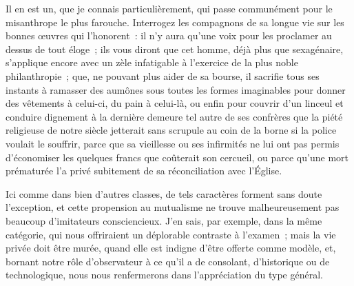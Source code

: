 \documentclass[french,twoside]{book} %
\begin{document}
Il en est un, que je connais particulièrement, qui passe communément pour le misanthrope le plus farouche. Interrogez les compagnons de sa longue vie sur les bonnes œuvres qui l’honorent : il n’y aura qu’une voix pour les proclamer au dessus de tout éloge ; ils vous diront que cet homme, déjà plus que sexagénaire, s’applique encore avec un zèle infatigable à l’exercice de la plus noble philanthropie ; que, ne pouvant plus aider de sa bourse, il sacrifie tous ses instants à ramasser des aumônes sous toutes les formes imaginables pour donner des vêtements à celui-ci, du pain à celui-là, ou enfin pour couvrir d’un linceul et conduire dignement à la dernière demeure tel autre de ses confrères que la piété religieuse de  notre siècle jetterait sans scrupule au coin de la borne si la police voulait le souffrir, parce que sa vieillesse ou ses infirmités ne lui ont pas permis d’économiser les quelques francs que coûterait son cercueil, ou parce qu’une mort prématurée l’a privé subitement de sa réconciliation avec l’Église.\par
Ici comme dans bien d’autres classes, de tels caractères forment sans doute l’exception, et cette propension au mutualisme ne trouve malheureusement pas beaucoup d’imitateurs consciencieux. J’en sais, par exemple, dans la même catégorie, qui nous offriraient un déplorable contraste à l’examen ; mais la vie privée doit être murée, quand elle est indigne d’être offerte comme modèle, et, bornant notre rôle d’observateur à ce qu’il a de consolant, d’historique ou de technologique, nous nous renfermerons dans l’appréciation du type général.\par
\end{document}
